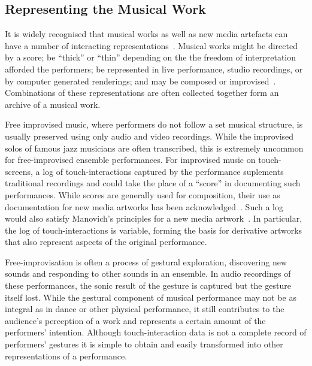 \documentclass{chi-ext}
\begin{document}
\subsection{Representing the Musical Work}


It is widely recognised that musical works as well as new media artefacts can have a number of
interacting representations~\cite{Rinehart:2007pi}. Musical works
might be directed by a score; be ``thick'' or ``thin''
depending on the the freedom of interpretation afforded the
performers; be represented in live performance, studio recordings, or
by computer generated renderings; and may be composed or improvised~\cite{Davies:2005fj}.
Combinations of these representations are often collected together
form an archive of a musical work.

Free improvised music, where performers do not follow a set musical
structure, is usually preserved using only audio and video recordings.
While the improvised solos of famous jazz musicians are often
transcribed, this is extremely uncommon
for free-improvised ensemble performances. For improvised music on
touch-screens, a log of 
touch-interactions captured by the performance suplements traditional
recordings and could take the place of a ``score'' in documenting
such performances. While scores are generally used for composition,
their use as documentation for new media artworks has been
acknowledged~\cite{MacDonald:2009ve}. Such a log would also satisfy Manovich's principles
for a new media artwork~\cite{Manovich:2002ly}. In particular, the log of
touch-interactions is variable, forming the basis for derivative
artworks that also represent aspects of the original performance. 

Free-improvisation is often a process of gestural exploration, discovering
new sounds and responding to other sounds in an ensemble. In audio
recordings of these performances, the sonic result of the gesture is
captured but the gesture itself lost. 
While the gestural component of musical
performance may not be as integral as in dance or other physical
performance, it still contributes to the audience's perception of a
work and represents a certain amount of the performers' intention.
Although touch-interaction data is not a complete record of
performers' gestures it is simple to obtain and easily transformed
into other representations of a performance.
\end{document}
